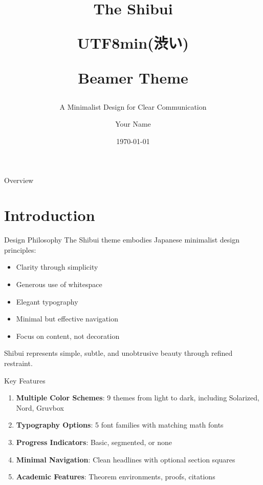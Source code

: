 \documentclass[aspectratio=169]{beamer}
\title{The Shibui \begin{CJK}{UTF8}{min}(渋い)\end{CJK} Beamer Theme}
\subtitle{A Minimalist Design for Clear Communication}
\author{Your Name}
\institute{Your Institution}
\date{\today}
\begin{document}
\maketitle

\begin{frame}{Overview}
  \tableofcontents
\end{frame}

\section{Introduction}


\begin{frame}{Design Philosophy}
  The Shibui theme embodies Japanese minimalist design principles:

  \begin{itemize}
    \item Clarity through simplicity
    \item Generous use of whitespace
    \item Elegant typography
    \item Minimal but effective navigation
    \item Focus on content, not decoration
  \end{itemize}

  \vspace{1em}
  Shibui represents simple, subtle, and unobtrusive beauty through refined restraint.
\end{frame}

\begin{frame}{Key Features}
  \begin{enumerate}
    \item \textbf{Multiple Color Schemes}: 9 themes from light to dark, including Solarized, Nord, Gruvbox
    \item \textbf{Typography Options}: 5 font families with matching math fonts
    \item \textbf{Progress Indicators}: Basic, segmented, or none
    \item \textbf{Minimal Navigation}: Clean headlines with optional section squares
    \item \textbf{Academic Features}: Theorem environments, proofs, citations
  \end{enumerate}
\end{frame}
\end{document}
